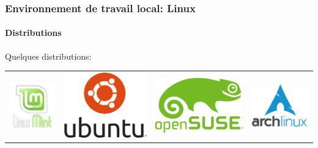 \documentclass[xcolor=table]{beamer}
\begin{document}
\begin{frame}
\frametitle{Environnement de travail local: Linux}
\framesubtitle{Distributions}

Quelques distributions:

\begin{tabular}{llll}
	\includegraphics[width=.2\textwidth]{..//img/Bweb01-environnement/mint-logo.png} & \includegraphics[width=.2\textwidth]{..//img/Bweb01-environnement/ubuntu-logo.png} &
	\includegraphics[width=.2\textwidth]{..//img/Bweb01-environnement/opensuse-logo.png} &
	\includegraphics[width=.2\textwidth]{..//img/Bweb01-environnement/arch-logo.png} \\
	

\end{tabular}
\end{frame}
\end{document}
